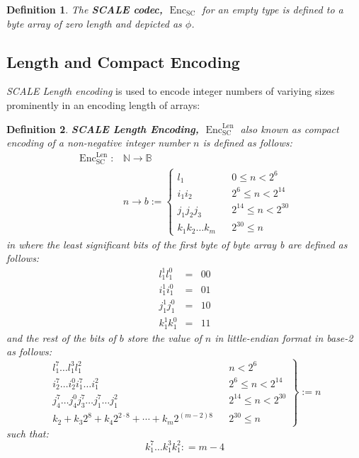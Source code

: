 \documentclass{book}
\newcommand{\assign}{:=}
\newcommand{\cdummy}{\cdot}
\newcommand{\nosymbol}{}
\newcommand{\tmem}[1]{{\em #1\/}}
\newcommand{\tmop}[1]{\ensuremath{\operatorname{#1}}}
\newcommand{\tmstrong}[1]{\textbf{#1}}
\newcommand{\tmtextbf}[1]{{\bfseries{#1}}}
\newcommand{\tmtextit}[1]{{\itshape{#1}}}
\newtheorem{definition}{Definition}
\providecommand{\cdummy}{{\cdot}}
\providecommand{\nosymbol}{}
\providecommand{\tmem}[1]{\tmtextit{#1}}
\providecommand{\tmop}[1]{\ensuremath{\mathrm{#1}}}
\providecommand{\tmstrong}[1]{\tmtextbf{#1}}
\providecommand{\tmtextbf}[1]{\tmtextbf{#1}}
\providecommand{\tmtextit}[1]{\tmtextit{#1}}
\newtheorem{definition}{Definition}
\begin{document}
\begin{definition}
  \label{defn-scale-empty}The {\tmstrong{SCALE codec,
  $\tmop{Enc}_{\tmop{SC}}$}} for an empty type is defined to a byte array of
  zero length and depicted as {\tmstrong{$\phi$}}.
\end{definition}

\subsection{Length and Compact Encoding}\label{sect-int-encoding}

{\tmem{SCALE Length encoding}} is used to encode integer numbers of variying
sizes prominently in an encoding length of arrays:

\begin{definition}
  \label{defn-sc-len-encoding}{\tmstrong{SCALE Length Encoding,
  $\tmop{Enc}^{\tmop{Len}}_{\tmop{SC}}$}} also known as compact encoding of a
  non-negative integer number $n$ is defined as follows:
  \[ \begin{array}{ll}
       \tmop{Enc}^{\tmop{Len}}_{\tmop{SC}} : & \mathbb{N} \rightarrow
       \mathbb{B}\\
       & n \rightarrow b \assign \left\{ \begin{array}{lll}
         l^{\nosymbol}_1 &  & 0 \leqslant n < 2^6\\
         i^{\nosymbol}_1 i^{\nosymbol}_2 &  & 2^6 \leqslant n < 2^{14}\\
         j^{\nosymbol}_1 j^{\nosymbol}_2 j_3 &  & 2^{14} \leqslant n <
         2^{30}\\
         k_1^{\nosymbol} k_2^{\nosymbol} \ldots k_m^{\nosymbol}  &  & 2^{30}
         \leqslant n
       \end{array} \right.
     \end{array} \]
  in where the least significant bits of the first byte of byte array b are
  defined as follows:
  \[ \begin{array}{lcc}
       l^1_1 l_1^0 & = & 00\\
       i^1_1 i_1^0 & = & 01\\
       j^1_1 j_1^0 & = & 10\\
       k^1_1 k_1^0 & = & 11
     \end{array} \]
  and the rest of the bits of $b$ store the value of $n$ in little-endian
  format in base-2 as follows:
  \[ \left. \begin{array}{lll}
       l^7_1 \ldots l^3_1 l^2_1 &  & n < 2^6\\
       i_2^7 \ldots i_2^0 i_1^7 \ldots i^2_1^{\nosymbol} &  & 2^6 \leqslant n
       < 2^{14}\\
       j_4^7 \ldots j_4^0 j_3^7 \ldots j_1^7 \ldots j^2_1 &  & 2^{14}
       \leqslant n < 2^{30}\\
       k_2 + k_3 2^8 + k_4 2^{2 \cdummy 8} + \cdots + k_m 2^{(m - 2) 8} &  &
       2^{30} \leqslant n
     \end{array} \right\} \assign n \]
  such that:
  \[ k^7_1 \ldots k^3_1 k^2_1 : = m - 4 \]
\end{definition}
\end{document}
